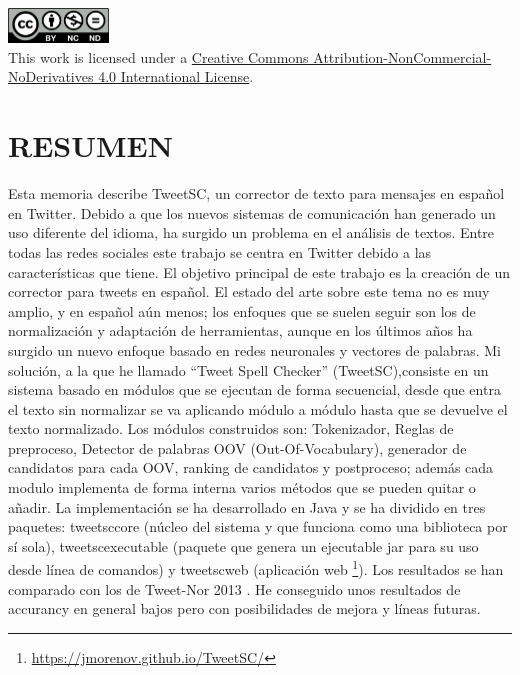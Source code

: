 \documentclass[spanish,12pt, a4paper,twoside]{paper}
\let\oldsection\section
\def\section{\cleardoublepage\oldsection}
\newcommand\blankpage{%
    \null
    \thispagestyle{empty}%
    \addtocounter{page}{-1}%
    \newpage}
\begin{document}
\afterpage{\blankpage}

\newpage
\null %
\vfill %
 
\includegraphics[width=0.2\textwidth]{recursos/by-nc-nd.png}\\
This work is licensed under a
\href{http://creativecommons.org/licenses/by-nc-nd/4.0/}
{Creative Commons Attribution-NonCommercial-NoDerivatives
4.0 International License}.


\section*{RESUMEN}
Esta memoria describe TweetSC, un corrector de texto para mensajes en español en Twitter. Debido a que los nuevos sistemas de comunicación han generado un uso diferente del idioma, ha surgido un problema en el análisis de textos. Entre todas las redes sociales este trabajo se centra en Twitter debido a las características que tiene. El objetivo principal de este trabajo es la creación de un corrector para tweets en español. El estado del arte sobre este tema no es muy amplio, y en español aún menos; los enfoques que se suelen seguir son los de normalización y adaptación de herramientas, aunque en los últimos años ha surgido un nuevo enfoque basado en redes neuronales y vectores de palabras. Mi solución, a la que he llamado ``Tweet Spell Checker'' (TweetSC),consiste en un sistema basado en módulos que se ejecutan de forma secuencial, desde que entra el texto sin normalizar se va aplicando módulo a módulo hasta que se devuelve el texto normalizado. Los módulos construidos son: Tokenizador, Reglas de preproceso, Detector de  palabras OOV (Out-Of-Vocabulary), generador de candidatos para cada OOV, ranking de candidatos y postproceso; además cada modulo implementa de forma interna varios métodos que se pueden quitar o añadir. La implementación se ha desarrollado en Java y se ha dividido en tres paquetes: tweetsccore (núcleo del sistema y que funciona como una biblioteca por sí sola), tweetscexecutable (paquete que genera un ejecutable jar para su uso desde línea de comandos) y tweetscweb (aplicación web \footnote{\url{https://jmorenov.github.io/TweetSC/}}). Los resultados se han comparado con los de Tweet-Nor 2013 \cite{alegria:2013}. He conseguido unos resultados de accurancy en general bajos pero con posibilidades de mejora y líneas futuras. 
\end{document}
